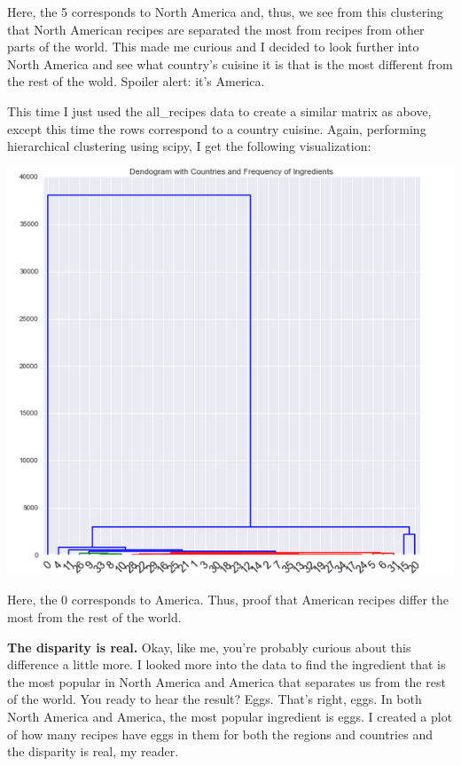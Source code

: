\documentclass[14pt]{extarticle}
\begin{document}
\raggedright

Here, the 5 corresponds to North America and, thus, we see from this clustering that North American recipes are separated the most from recipes from other parts of the world. This made me curious and I decided to look further into North America and see what country's cuisine it is that is the most different from the rest of the wold. Spoiler alert: it's America. 

This time I just used the all\_recipes data to create a similar matrix as above, except this time the rows correspond to a country cuisine. Again, performing hierarchical clustering using scipy, I get the following visualization:

\centering
\begin{minipage}[t]{.9\textwidth}
	\includegraphics[width=\textwidth]{Countries_Ingredients.png}
\end{minipage}

\raggedright

Here, the 0 corresponds to America. Thus, proof that American recipes differ the most from the rest of the world. 

\vspace{3mm}
\textbf{The disparity is real.} Okay, like me, you're probably curious about this difference a little more. I looked more into the data to find the ingredient that is the most popular in North America and America that separates us from the rest of the world. You ready to hear the result? Eggs. That's right, eggs. In both North America and America, the most popular ingredient is eggs. I created a plot of how many recipes have eggs in them for both the regions and countries and the disparity is real, my reader. 
\end{document}

